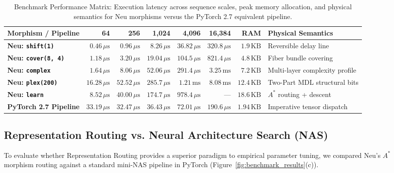 \documentclass[11pt]{article}
\begin{document}
\begin{table}[htbp]
\centering
\footnotesize
\setlength{\tabcolsep}{4.5pt}
\renewcommand{\arraystretch}{1.1}
\begin{tabularx}{\linewidth}{l rrr rrr >{\raggedright\arraybackslash}X}
\toprule
\textbf{Morphism / Pipeline} & \textbf{64} & \textbf{256} & \textbf{1,024} & \textbf{4,096} & \textbf{16,384} & \textbf{RAM} & \textbf{Physical Semantics} \\
\midrule
\textbf{Neu: \texttt{shift(1)}} & $0.46\,\mu\text{s}$ & $0.96\,\mu\text{s}$ & $8.26\,\mu\text{s}$ & $36.82\,\mu\text{s}$ & $320.8\,\mu\text{s}$ & $1.9\,\text{KB}$ & Reversible delay line \\
\textbf{Neu: \texttt{cover(8, 4)}} & $1.18\,\mu\text{s}$ & $3.20\,\mu\text{s}$ & $19.04\,\mu\text{s}$ & $104.5\,\mu\text{s}$ & $821.4\,\mu\text{s}$ & $4.8\,\text{KB}$ & Fiber bundle covering \\
\textbf{Neu: \texttt{complex}} & $1.64\,\mu\text{s}$ & $8.06\,\mu\text{s}$ & $52.06\,\mu\text{s}$ & $291.4\,\mu\text{s}$ & $3.25\,\text{ms}$ & $7.2\,\text{KB}$ & Multi-layer complexity profile \\
\textbf{Neu: \texttt{plex(200)}} & $16.28\,\mu\text{s}$ & $52.52\,\mu\text{s}$ & $285.7\,\mu\text{s}$ & $1.21\,\text{ms}$ & $8.08\,\text{ms}$ & $12.4\,\text{KB}$ & Two-Part MDL structural bits \\
\textbf{Neu: \texttt{learn}} & $8.52\,\mu\text{s}$ & $40.00\,\mu\text{s}$ & $174.7\,\mu\text{s}$ & $978.4\,\mu\text{s}$ & --- & $18.6\,\text{KB}$ & $A^*$ routing + descent \\
\midrule
\textbf{PyTorch 2.7 Pipeline} & $33.19\,\mu\text{s}$ & $32.47\,\mu\text{s}$ & $36.43\,\mu\text{s}$ & $72.01\,\mu\text{s}$ & $190.6\,\mu\text{s}$ & $1.94\,\text{KB}$ & Imperative tensor dispatch \\
\bottomrule
\end{tabularx}
\caption{Benchmark Performance Matrix: Execution latency across sequence scales, peak memory allocation, and physical semantics for Neu morphisms versus the PyTorch 2.7 equivalent pipeline.}
\label{tab:benchmark_matrix}
\end{table}

\subsection{Representation Routing vs. Neural Architecture Search (NAS)}
To evaluate whether Representation Routing provides a superior paradigm to empirical parameter tuning, we compared Neu's $A^*$ morphism routing against a standard mini-NAS pipeline in PyTorch (Figure~\ref{fig:benchmark_results}(c)). 
\end{document}
